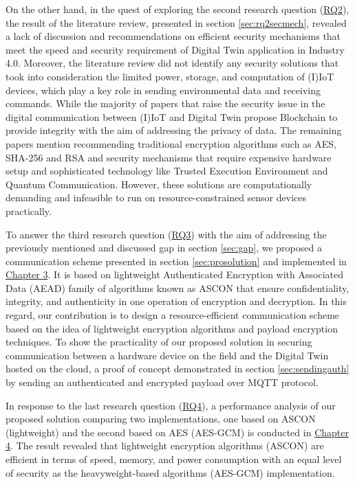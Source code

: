 On the other hand, in the quest of exploring the second research question (\hyperref[lbl:rq1]{RQ2}), the result of the literature review, presented in section \ref{sec:rq2secmech}, revealed a lack of discussion and recommendations on efficient security mechanisms that meet the speed and security requirement of Digital Twin application in Industry 4.0. Moreover, the literature review did not identify any security solutions that took into consideration the limited power, storage, and computation of (I)IoT devices, which play a key role in sending environmental data and receiving commands. While the majority of papers that raise the security issue in the digital communication between (I)IoT and Digital Twin propose Blockchain to provide integrity with the aim of addressing the privacy of data. The remaining papers mention recommending traditional encryption algorithms such as AES, SHA-256 and RSA and security mechanisms that require expensive hardware setup and sophisticated technology like Trusted Execution Environment and Quantum Communication. However, these solutions are computationally demanding and infeasible to run on resource-constrained sensor devices practically.


To answer the third research question (\hyperref[lbl:rq1]{RQ3}) with the aim of addressing the previously mentioned and discussed gap in section \ref{sec:gap}, we proposed a communication scheme presented in section \ref{sec:prosolution} and implemented in \hyperref[Chapter3]{Chapter 3}. It is based on lightweight Authenticated Encryption with Associated Data (AEAD) family of algorithms known as ASCON that ensure confidentiality, integrity, and authenticity in one operation of encryption and decryption. In this regard, our contribution is to design a resource-efficient communication scheme based on the idea of lightweight encryption algorithms and payload encryption techniques. To show the practicality of our proposed solution in securing communication between a hardware device on the field and the Digital Twin hosted on the cloud, a proof of concept demonstrated in section \ref{sec:sendingauth} by sending an authenticated and encrypted payload over MQTT protocol.

In response to the last research question (\hyperref[lbl:rq1]{RQ4}), a performance analysis of our proposed solution comparing two implementations, one based on ASCON (lightweight) and the second based on AES (AES-GCM) is conducted in \hyperref[Chapter4]{Chapter 4}. The result revealed that lightweight encryption algorithms (ASCON) are efficient in terms of speed, memory, and power consumption with an equal level of security as the heavyweight-based algorithms (AES-GCM) implementation. 


